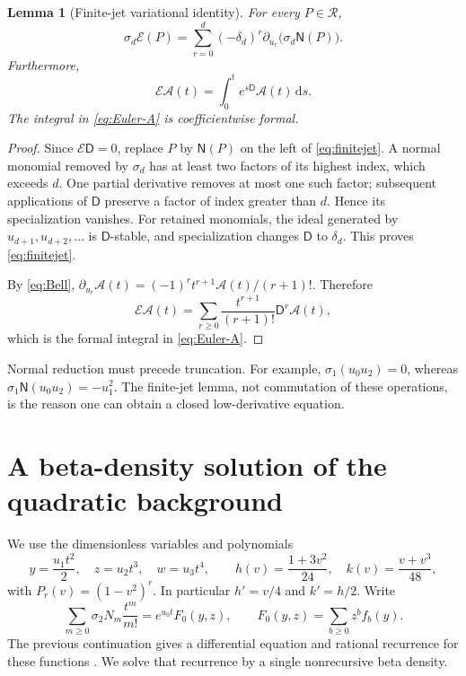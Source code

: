\documentclass[11pt]{article}
\numberwithin{equation}{section}
\newtheorem{lemma}[theorem]{Lemma}
\theoremstyle{definition}\newtheorem{definition}[theorem]{Definition}
\theoremstyle{remark}\newtheorem{remark}[theorem]{Remark}
\newcommand{\Rcal}{\mathscr R}
\newcommand{\NF}{\mathsf N}\newcommand{\Prim}{\mathsf H}
\newcommand{\D}{\mathsf D}\newcommand{\Euler}{\mathscr E}
\newcommand{\Acal}{\mathcal A}
\newcommand{\dd}{\,\mathrm d}
\begin{document}
\begin{lemma}[Finite-jet variational identity]\label{lem:finitejet}
For every $P\in\Rcal$,
\begin{equation}\label{eq:finitejet}
 \sigma_d\Euler(P)=
 \sum_{r=0}^d(-\delta_d)^r\partial_{u_r}\bigl(\sigma_d\NF(P)\bigr).
\end{equation}
Furthermore,
\begin{equation}\label{eq:Euler-A}
 \Euler\Acal(t)=\int_0^t e^{s\D}\Acal(t)\dd s.
\end{equation}
The integral in \eqref{eq:Euler-A} is coefficientwise formal.
\end{lemma}
\begin{proof}
Since $\Euler\D=0$, replace $P$ by $\NF(P)$ on the left of
\eqref{eq:finitejet}. A normal monomial removed by $\sigma_d$ has at
least two factors of its highest index, which exceeds $d$. One partial
derivative removes at most one such factor; subsequent applications of
$\D$ preserve a factor of index greater than $d$. Hence its specialization
vanishes. For retained monomials, the ideal generated by
$u_{d+1},u_{d+2},\ldots$ is $\D$-stable, and specialization changes
$\D$ to $\delta_d$. This proves \eqref{eq:finitejet}.

By \eqref{eq:Bell},
$\partial_{u_r}\Acal(t)=(-1)^rt^{r+1}\Acal(t)/(r+1)!$. Therefore
\[
 \Euler\Acal(t)=\sum_{r\ge0}\frac{t^{r+1}}{(r+1)!}\D^r\Acal(t),
\]
which is the formal integral in \eqref{eq:Euler-A}.
\end{proof}

Normal reduction must precede truncation. For example,
$\sigma_1(u_0u_2)=0$, whereas
$\sigma_1\NF(u_0u_2)=-u_1^2$.
The finite-jet lemma, not commutation of these operations, is the reason
one can obtain a closed low-derivative equation.


\section{A beta-density solution of the quadratic background}
\label{sec:quadratic}

We use the dimensionless variables and polynomials
\begin{equation}\label{eq:basic-variables}
 y=\frac{u_1t^2}{2},\quad z=u_2t^3,\quad w=u_3t^4,\qquad
 h(v)=\frac{1+3v^2}{24},\quad k(v)=\frac{v+v^3}{48},
\end{equation}
with $P_r(v)=(1-v^2)^r$. In particular $h'=v/4$ and $k'=h/2$.
Write
\[
 \sum_{m\ge0}\sigma_2N_m\frac{t^m}{m!}
 =e^{u_0t}F_0(y,z),\qquad F_0(y,z)=\sum_{b\ge0}z^bf_b(y).
\]
The previous continuation gives a differential equation and rational
recurrence for these functions \cite{RepoQuadratic}. We solve that
recurrence by a single nonrecursive beta density.
\end{document}
